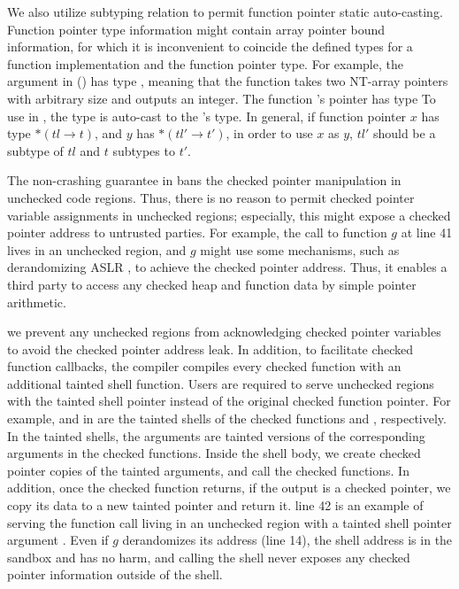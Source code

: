 We also utilize \systemname subtyping relation to permit function pointer static auto-casting.
Function pointer type information might contain array pointer bound information,
for which it is inconvenient to coincide the defined types for a function implementation and the function pointer type. 
For example, the  argument in  ()
has type ,
meaning that the function takes two NT-array pointers with arbitrary size and outputs an integer.
The function 's pointer has type 
To use  in , the type is auto-cast to the 's type.
In general, if function pointer $x$ has type $* (tl \to t)$, and  $y$ has $* (tl' \to t')$,
in order to use $x$ as $y$, $tl'$ should be a subtype of $tl$ and $t$ subtypes to $t'$.

The non-crashing guarantee in \systemname bans the checked pointer manipulation in unchecked code regions.
Thus, there is no reason to permit checked pointer variable assignments in unchecked regions;
especially, this might expose a checked pointer address to untrusted parties.
For example, the call to function $g$ at  line 41 lives in an unchecked region,
and $g$ might use some mechanisms, such as derandomizing ASLR \cite{shacham-aslr},
to achieve the checked pointer address.
Thus, it enables a third party to access any checked heap and function data by simple pointer arithmetic.

we prevent any unchecked regions from acknowledging checked pointer variables to avoid the checked pointer address leak.
In addition, to facilitate checked function callbacks, 
the \systemname compiler compiles every checked function
with an additional tainted shell function.
Users are required to serve unchecked regions with the tainted shell pointer instead of the original checked function pointer.
For example,  and  in  
are the tainted shells of the checked functions  and , respectively.
In the tainted shells, the arguments are tainted versions of the corresponding arguments in the checked functions.
Inside the shell body, we create checked pointer copies of the tainted arguments, and call the checked functions.
In addition, once the checked function returns,
if the output is a checked pointer, we copy its data to a new tainted pointer and return it.
 line 42 is an example of serving the function call living in an unchecked region
with a tainted shell pointer argument .
Even if $g$ derandomizes its address (line 14), the shell address is in the sandbox and has no harm,
and calling the shell never exposes any checked pointer information outside of the shell.

